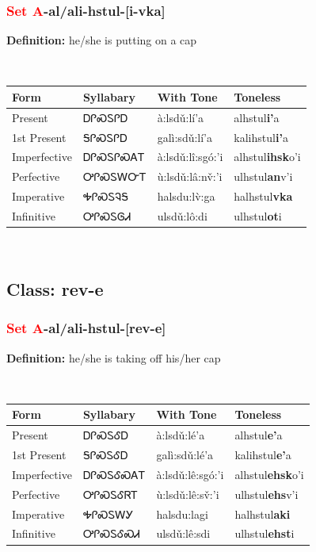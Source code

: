 \subsubsection*{\textcolor{Red}{Set A}{-}al/ali{-}\textbf{hstul}{-}[i-vka]}
\nopagebreak
\textbf{Definition: } he/she is putting on a cap
\\[0.5em]
\begin{tabularx}{\textwidth}{l X X X}%
\toprule%
\textbf{Form}&\textbf{Syllabary}&\textbf{With Tone}&\textbf{Toneless}\\%
\midrule%
Present&ᎠᎵᏍᏚᎵᎠ&à:lsdǔ:lí’a&alhstul\textbf{i'}a\\%
1st Present&ᎦᎵᏍᏚᎵᎠ&galì:sdǔ:lí’a&kalihstul\textbf{i'}a\\%
Imperfective&ᎠᎵᏍᏚᎵᏍᎪᎢ&à:lsdǔ:lî:sgó:’i&alhstul\textbf{ihsk}o'i\\%
Perfective&ᎤᎵᏍᏚᎳᏅᎢ&ù:lsdǔ:lâ:nv̌:’i&ulhstul\textbf{an}v'i\\%
Imperative&ᎭᎵᏍᏚᎸᎦ&halsdu:lv̀:ga&halhstul\textbf{vka}\\%
Infinitive&ᎤᎵᏍᏚᎶᏗ&ulsdǔ:lô:di&ulhstul\textbf{ot}i\\%
\bottomrule%
\end{tabularx}
\\[1em]
\needspace{3in}
\subsection*{Class: rev-e}
\nopagebreak
\needspace{2in}
\subsubsection*{\textcolor{Red}{Set A}{-}al/ali{-}\textbf{hstul}{-}[rev-e]}
\nopagebreak
\textbf{Definition: } he/she is taking off his/her cap
\\[0.5em]
\begin{tabularx}{\textwidth}{l X X X}%
\toprule%
\textbf{Form}&\textbf{Syllabary}&\textbf{With Tone}&\textbf{Toneless}\\%
\midrule%
Present&ᎠᎵᏍᏚᎴᎠ&à:lsdǔ:lé’a&alhstul\textbf{e'}a\\%
1st Present&ᎦᎵᏍᏚᎴᎠ&galì:sdǔ:lé’a&kalihstul\textbf{e'}a\\%
Imperfective&ᎠᎵᏍᏚᎴᏍᎪᎢ&à:lsdǔ:lê:sgó:’i&alhstul\textbf{ehsk}o'i\\%
Perfective&ᎤᎵᏍᏚᎴᏒᎢ&ù:lsdǔ:lê:sv̌:’i&ulhstul\textbf{ehs}v'i\\%
Imperative&ᎭᎵᏍᏚᎳᎩ&halsdu:lagi&halhstul\textbf{aki}\\%
Infinitive&ᎤᎵᏍᏚᎴᏍᏗ&ulsdǔ:lê:sdi&ulhstul\textbf{ehst}i\\%
\bottomrule%
\end{tabularx}
\\[1em]
\needspace{3in}

